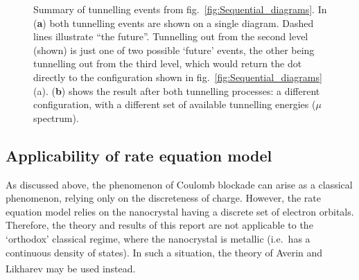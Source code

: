 \documentclass[a4paper,11pt]{article}
\let\oldcite\cite
\renewcommand{\cite}[1]{\textsuperscript{\oldcite{#1}}}
\begin{document}
\begin{figure}[p]
\begin{center}
{
        }
        \caption{Summary of tunnelling events from fig.~\ref{fig:Sequential_diagrams}. In (\textbf{a}) both tunnelling events are shown on a single diagram. Dashed lines illustrate ``the future''. Tunnelling out from the second level (shown) is just one of two possible `future' events, the other being tunnelling out from the third level, which would return the dot directly to the configuration shown in fig.~\ref{fig:Sequential_diagrams}(a). (\textbf{b}) shows the result after both tunnelling processes: a different configuration, with a different set of available tunnelling energies ($\mu$ spectrum).}
        \label{fig:Combined_diagram}
    \end{center}
    \end{figure}

    \subsection{Applicability of rate equation model}
    As discussed above, the phenomenon of Coulomb blockade can arise as a classical phenomenon, relying only on the discreteness of charge. However, the rate equation model relies on the nanocrystal having a discrete set of electron orbitals. Therefore, the theory and results of this report are not applicable to the `orthodox' classical regime, where the nanocrystal is metallic (i.e.\ has a continuous density of states). In such a situation, the theory of Averin and Likharev\cite{Averin-1991} may be used instead. %
\end{document}
